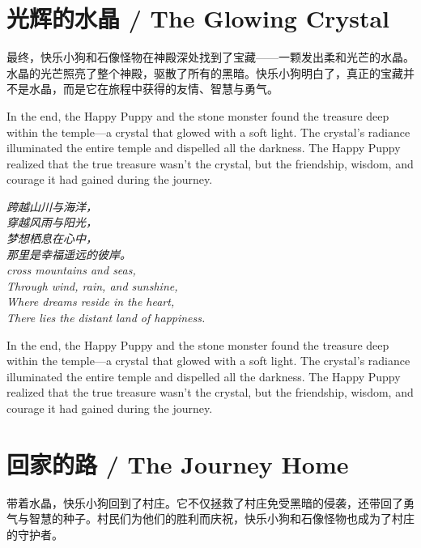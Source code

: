 \section*{光辉的水晶 / The Glowing Crystal}

最终，快乐小狗和石像怪物在神殿深处找到了宝藏——一颗发出柔和光芒的水晶。水晶的光芒照亮了整个神殿，驱散了所有的黑暗。快乐小狗明白了，真正的宝藏并不是水晶，而是它在旅程中获得的友情、智慧与勇气。

\begin{flushright}
In the end, the Happy Puppy and the stone monster found the treasure deep within the temple—a crystal that glowed with a soft light. The crystal’s radiance illuminated the entire temple and dispelled all the darkness. The Happy Puppy realized that the true treasure wasn’t the crystal, but the friendship, wisdom, and courage it had gained during the journey.
\end{flushright}

\begin{center}
    \textit{
    跨越山川与海洋，\\
    穿越风雨与阳光，\\
    梦想栖息在心中，\\
    那里是幸福遥远的彼岸。 \\
    cross mountains and seas,\\
    Through wind, rain, and sunshine,\\
    Where dreams reside in the heart,\\
    There lies the distant land of happiness.
    }
    \end{center}

\begin{flushright}
In the end, the Happy Puppy and the stone monster found the treasure deep within the temple—a crystal that glowed with a soft light. The crystal’s radiance illuminated the entire temple and dispelled all the darkness. The Happy Puppy realized that the true treasure wasn’t the crystal, but the friendship, wisdom, and courage it had gained during the journey.
\end{flushright}

\section*{回家的路 / The Journey Home}

带着水晶，快乐小狗回到了村庄。它不仅拯救了村庄免受黑暗的侵袭，还带回了勇气与智慧的种子。村民们为他们的胜利而庆祝，快乐小狗和石像怪物也成为了村庄的守护者。

